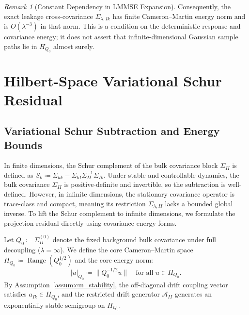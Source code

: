 \documentclass[11pt]{amsart}
\theoremstyle{plain}
\theoremstyle{definition}
\theoremstyle{remark}
\newtheorem{remark}[theorem]{Remark}
\begin{document}
    \begin{remark}[Constant Dependency in LMMSE Expansion]
        Consequently, the exact leakage cross-covariance
        $\Sigma_{\lambda,Ik}$ has finite Cameron--Martin energy norm and is
        $O(\lambda^{-3})$ in that norm.  This is a condition on the deterministic
        response and covariance energy; it does not assert that infinite-dimensional
        Gaussian sample paths lie in $H_{Q_0}$ almost surely.
    \end{remark}

    \section{Hilbert-Space Variational Schur Residual}
    \label{sec:infdim}

    \subsection{Variational Schur Subtraction and Energy Bounds}
    \label{sec:infdim:variational}

    In finite dimensions, the Schur complement of the bulk covariance block $\Sigma_{II}$ is defined as $S_k \coloneqq \Sigma_{kk} - \Sigma_{kI} \Sigma_{II}^{-1} \Sigma_{Ik}$. Under stable and controllable dynamics, the bulk covariance $\Sigma_{II}$ is positive-definite and invertible, so the subtraction is well-defined. However, in infinite dimensions, the stationary covariance operator is trace-class and compact, meaning its restriction $\Sigma_{\lambda,II}$ lacks a bounded global inverse. To lift the Schur complement to infinite dimensions, we formulate the projection residual directly using covariance-energy forms.

    Let $Q_0 \coloneqq \Sigma_{II}^{(0)}$ denote the fixed background bulk covariance under full decoupling ($\lambda = \infty$). We define the core Cameron--Martin space $H_{Q_0} \coloneqq \operatorname{Range}(Q_0^{1/2})$ and the core energy norm:
    \begin{equation}
        |u|_{Q_0} \coloneqq \|Q_0^{-1/2} u\| \quad \text{for all } u \in H_{Q_0}.
    \end{equation}
    By Assumption~\ref{assum:cm_stability}, the off-diagonal drift coupling vector satisfies $a_{Ik} \in H_{Q_0}$, and the restricted drift generator $\mathcal{A}_{II}$ generates an exponentially stable semigroup on $H_{Q_0}$.
\end{document}
